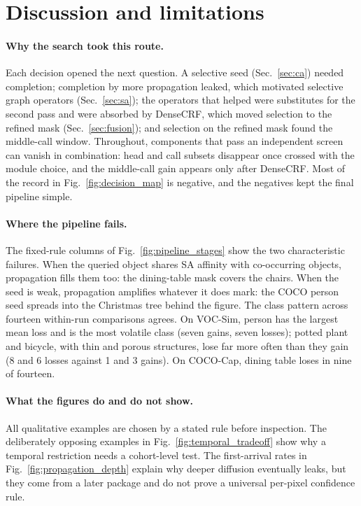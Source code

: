\section{Discussion and limitations}
\label{sec:discussion}
\paragraph{Why the search took this route.}
Each decision opened the next question. A selective seed (Sec.~\ref{sec:ca}) needed completion; completion by more propagation leaked, which motivated selective graph operators (Sec.~\ref{sec:sa}); the operators that helped were substitutes for the second pass and were absorbed by DenseCRF, which moved selection to the refined mask (Sec.~\ref{sec:fusion}); and selection on the refined mask found the middle-call window. Throughout, components that pass an independent screen can vanish in combination: head and call subsets disappear once crossed with the module choice, and the middle-call gain appears only after DenseCRF. Most of the record in Fig.~\ref{fig:decision_map} is negative, and the negatives kept the final pipeline simple.

\paragraph{Where the pipeline fails.}
The fixed-rule columns of Fig.~\ref{fig:pipeline_stages} show the two characteristic failures. When the queried object shares SA affinity with co-occurring objects, propagation fills them too: the dining-table mask covers the chairs. When the seed is weak, propagation amplifies whatever it does mark: the COCO person seed spreads into the Christmas tree behind the figure. The class pattern across fourteen within-run comparisons agrees. On VOC-Sim, person has the largest mean loss and is the most volatile class (seven gains, seven losses); potted plant and bicycle, with thin and porous structures, lose far more often than they gain (8 and 6 losses against 1 and 3 gains). On COCO-Cap, dining table loses in nine of fourteen.

\paragraph{What the figures do and do not show.}
All qualitative examples are chosen by a stated rule before inspection. The deliberately opposing examples in Fig.~\ref{fig:temporal_tradeoff} show why a temporal restriction needs a cohort-level test. The first-arrival rates in Fig.~\ref{fig:propagation_depth} explain why deeper diffusion eventually leaks, but they come from a later package and do not prove a universal per-pixel confidence rule.

